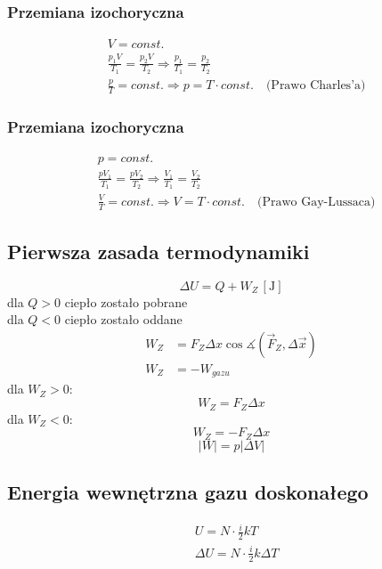 \documentclass{article}
\numberwithin{equation}{section}
\newcommand{\unit}[1]{\, \left[\mathrm{#1}\right]}
\begin{document}
      \subsubsection{Przemiana izochoryczna}
        \begin{align}
          &V = const.\\
          &\frac{p_1V}{T_1} = \frac{p_2V}{T_2} \Rightarrow \frac{p_1}{T_1} = \frac{p_2}{T_2}\\
          &\frac{p}{T} = const. \Rightarrow p = T\cdot const. \quad\text{(Prawo Charles'a)}
        \end{align}
      \subsubsection{Przemiana izochoryczna}
        \begin{align}
          &p = const.\\
          &\frac{pV_1}{T_1} = \frac{pV_2}{T_2} \Rightarrow \frac{V_1}{T_1} = \frac{V_2}{T_2}\\
          &\frac{V}{T} = const. \Rightarrow V = T\cdot const. \quad\text{(Prawo Gay-Lussaca)}
        \end{align}
    \subsection{Pierwsza zasada termodynamiki}
      \begin{equation}
        \Delta U = Q + W_Z \unit{J}
      \end{equation}
      dla $Q > 0$ ciepło zostało pobrane\\
      dla $Q < 0$ ciepło zostało oddane
      \begin{align}
        W_Z &= F_Z\Delta x\cos\measuredangle\left(\vec F_Z, \Delta\vec x\right)\\
        W_Z &= -W_{gazu}
      \end{align}
      dla $W_Z > 0$:
      \begin{equation}
        W_Z = F_Z\Delta x
      \end{equation}
      dla $W_Z < 0$:
      \begin{equation}
        W_Z = -F_Z\Delta x
      \end{equation}
      \begin{equation}
        |W| = p|\Delta V|
      \end{equation}
    \subsection{Energia wewnętrzna gazu doskonałego}
      \begin{align}
        &U = N\cdot\frac{i}{2}kT\\
        &\Delta U = N\cdot\frac{i}{2}k\Delta T
      \end{align}
\end{document}
